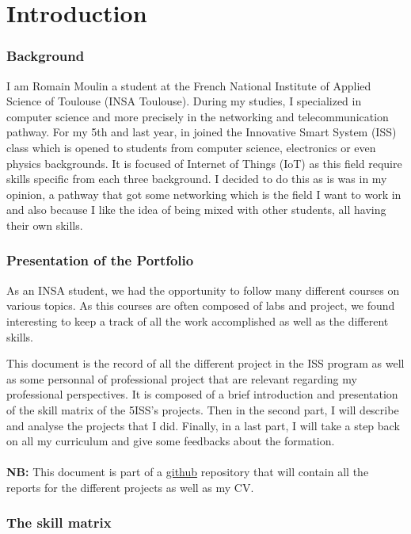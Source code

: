 \part{Introduction}

\section{Background}

I am Romain Moulin a student at the French National Institute of Applied Science of Toulouse (INSA Toulouse). During my studies, I specialized in computer science and more precisely in the networking and telecommunication pathway. For my 5th and last year, in joined the Innovative Smart System (ISS) class which is opened to students from computer science, electronics or even physics backgrounds. It is focused of Internet of Things (IoT) as this field require skills specific from each three background. I decided to do this as is was in my opinion, a pathway that got some networking which is the field I want to work in and also because I like the idea of being mixed with other students, all having their own skills.

\section{Presentation of the Portfolio}

As an INSA student, we had the opportunity to follow many different courses on various topics. As this courses are often composed of labs and project, we found interesting to keep a track of all the work accomplished as well as the different skills.
\\\par 
This document is the record of all the different project in the ISS program as well as some personnal of professional project that are relevant regarding my professional perspectives. It is composed of a brief introduction and presentation of the skill matrix of the 5ISS's projects. Then in the second part, I will describe and analyse the projects that I did. Finally, in a last part, I will take a step back on all my curriculum and give some feedbacks about the formation.
\\ \\
\textbf{NB: }This document is part of a \href{https://github.com/RomainMln/Portfolio}{github} repository that will contain all the reports for the different projects as well as my CV.

\section{The skill matrix}

